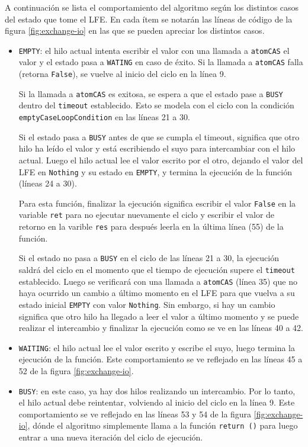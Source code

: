 A continuación se lista el comportamiento del algoritmo según los distintos casos del estado que tome el LFE. En cada ítem se notarán las líneas de código de la figura \ref{fig:exchange-io} en las que se pueden apreciar los distintos casos.

\begin{itemize}
\item{
\texttt{EMPTY}: el hilo actual intenta escribir el valor con una llamada a \texttt{atomCAS} el valor y el estado pasa a \texttt{WATING} en caso de éxito. Si la llamada a \texttt{atomCAS} falla (retorna \texttt{False}), se vuelve al inicio del ciclo en la línea 9.

Si la llamada a \texttt{atomCAS} es exitosa, se espera a que el estado pase a \texttt{BUSY} dentro del \texttt{timeout} establecido. Esto se modela con el ciclo con la condición \texttt{emptyCaseLoopCondition} en las líneas 21 a 30.

Si el estado pasa a \texttt{BUSY} antes de que se cumpla el timeout, significa que otro hilo ha leído el valor y está escribiendo el suyo para intercambiar con el hilo actual. Luego el hilo actual lee el valor escrito por el otro, dejando el valor del LFE en \texttt{Nothing} y su estado en \texttt{EMPTY}, y termina la ejecución de la función (líneas 24 a 30).} Para esta función, finalizar la ejecución significa escribir el valor \texttt{False} en la variable \texttt{ret} para no ejecutar nuevamente el ciclo y escribir el valor de retorno en la varible \texttt{res} para después leerla en la última línea (55) de la función.

Si el estado no pasa a \texttt{BUSY} en el ciclo de las líneas 21 a 30, la ejecución saldrá del ciclo en el momento que el tiempo de ejecución supere el \texttt{timeout} establecido. Luego se verificará con una llamada a \texttt{atomCAS} (línea 35) que no haya ocurrido un cambio a último momento en el LFE para que vuelva a su estado inicial \texttt{EMPTY} con valor \texttt{Nothing}. Sin embargo, si hay un cambio significa que otro hilo ha llegado a leer el valor a último momento y se puede realizar el intercambio y finalizar la ejecución como se ve en las líneas 40 a 42.


\item{\texttt{WAITING}: el hilo actual lee el valor escrito y escribe el suyo, luego termina la ejecución de la función. Este comportamiento se ve reflejado en las líneas 45 a 52 de la figura \ref{fig:exchange-io}.}
\item{\texttt{BUSY}: en este caso, ya hay dos hilos realizando un intercambio. Por lo tanto, el hilo actual debe reintentar, volviendo al inicio del ciclo en la línea 9. Este comportamiento se ve reflejado en las líneas 53 y 54 de la figura \ref{fig:exchange-io}, dónde el algoritmo simplemente llama a la función \texttt{return ()} para luego entrar a una nueva iteración del ciclo de ejecución.}
\end{itemize}
\newpage

